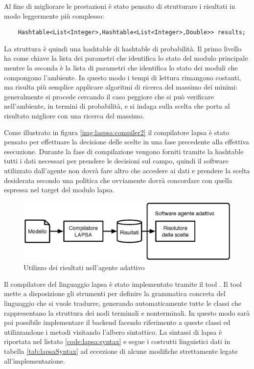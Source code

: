 Al fine di migliorare le prestazioni è stato pensato di strutturare i risultati in modo leggermente più complesso:
\begin{verbatim}
	Hashtable<List<Integer>,Hashtable<List<Integer>,Double>> results;
\end{verbatim}
La struttura è quindi una hashtable di hashtable di probabilità. Il primo livello ha come chiave la lista dei parametri che identifica lo stato del modulo principale mentre la seconda è la lista di parametri che identifica lo stato dei moduli che compongono l'ambiente. In questo modo i tempi di lettura rimangono costanti, ma risulta più semplice applicare algoritmi di ricerca del massimo dei minimi: generalmente si procede cercando il caso peggiore che si può verificare nell'ambiente, in termini di probabilità, e si indaga sulla scelta che porta al risultato migliore con una ricerca del massimo.

Come illustrato in figura \ref{img:laspsa:compiler2} il compilatore \ac{lapsa} è stato pensato per effettuare la decisione delle scelte in una fase precedente alla effettiva esecuzione. Durante la fase di compilazione vengono forniti tramite la hashtable tutti i dati necessari per prendere le decisioni sul campo, quindi il software utilizzato dall'agente non dovrà fare altro che accedere ai dati e prendere la scelta desiderata secondo una politica che ovviamente dovrà concordare con quella espressa nel target del modulo \ac{lapsa}.

\begin{figure}[htbp!]
	\begin{centering}
		\includegraphics[width=\textwidth]{Images/lapsa2}
	\end{centering}
	\caption{Utilizzo dei risultati nell'agente adattivo}
	\label{fig:lapsa:compiler2}
\end{figure}

Il compilatore del linguaggio \ac{lapsa} è stato implementato tramite il tool \xtext{} \cite{xtext}. Il tool mette a disposizione gli strumenti per definire la grammatica concreta del linguaggio che si vuole tradurre, generando automaticamente tutte le classi \java{} che rappresentano la struttura dei nodi terminali e nonterminali. In questo modo sarà poi possibile implementare il backend facendo riferimento a queste classi ed utilizzandone i metodi visitando l'albero sintattico. La sintassi di \ac{lapsa} è riportata nel listato \ref{code:lapsa:syntax} e segue i costrutti linguistici dati in tabella \ref{tab:lapsaSyntax} ad eccezione di alcune modifiche strettamente legate all'implementazione.

